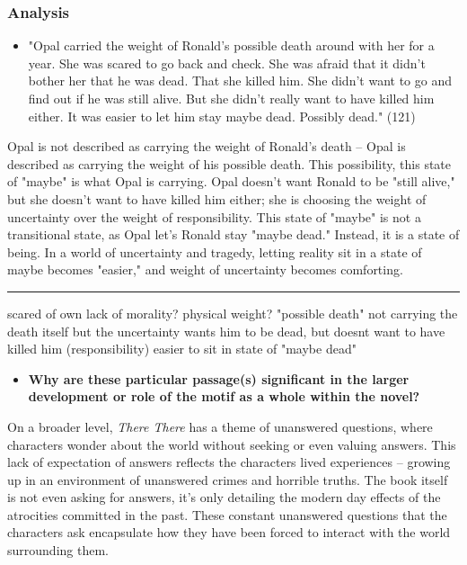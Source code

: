 \documentclass[letterpaper]{article}
\begin{document}
\subsubsection{Analysis}
\label{sec:orgada94d0}
\begin{itemize}
\item "Opal carried the weight of Ronald's possible death around with her
for a year. She was scared to go back and check. She was afraid that
it didn't bother her that he was dead. That she killed him. She didn't
want to go and find out if he was still alive. But she didn't really
want to have killed him either. It was easier to let him stay maybe
dead. Possibly dead." (121)
\end{itemize}

Opal is not described as carrying the weight of Ronald's death -- Opal
is described as carrying the weight of his possible death. This
possibility, this state of "maybe" is what Opal is carrying. Opal
doesn't want Ronald to be "still alive," but she doesn't want to have
killed him either; she is choosing the weight of uncertainty over the
weight of responsibility. This state of "maybe" is not a transitional
state, as Opal let's Ronald stay "maybe dead." Instead, it is a state of
being. In a world of uncertainty and tragedy, letting reality sit in a
state of maybe becomes "easier," and weight of uncertainty becomes
comforting.

\noindent\rule{\textwidth}{0.5pt}

scared of own lack of morality? physical weight? "possible death" not
carrying the death itself but the uncertainty wants him to be dead, but
doesnt want to have killed him (responsibility) easier to sit in state
of "maybe dead"

\begin{itemize}
\item \textbf{Why are these particular passage(s) significant in the larger
development or role of the motif as a whole within the novel?}
\end{itemize}

On a broader level, \emph{There There} has a theme of unanswered questions,
where characters wonder about the world without seeking or even valuing
answers. This lack of expectation of answers reflects the characters
lived experiences -- growing up in an environment of unanswered crimes
and horrible truths. The book itself is not even asking for answers,
it's only detailing the modern day effects of the atrocities committed
in the past. These constant unanswered questions that the characters ask
encapsulate how they have been forced to interact with the world
surrounding them.
\end{document}
